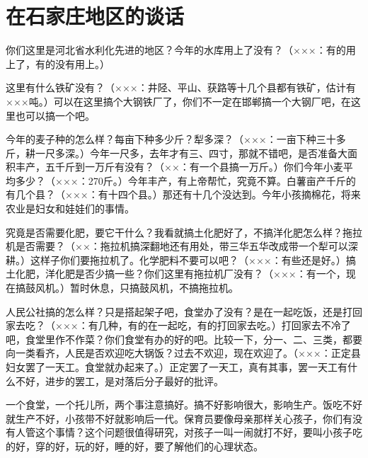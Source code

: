 \section[在石家庄地区的谈话（一九五八年十月三十一日）]{在石家庄地区的谈话}


你们这里是河北省水利化先进的地区？今年的水库用上了没有？（×××：有的用上了，有的没有用上。）

这里有什么铁矿没有？（×××：井陉、平山、获路等十几个县都有铁矿，估计有×××吨。）可以在这里搞个大钢铁厂了，你们不一定在邯郸搞一个大钢厂吧，在这里也可以搞一个吧。

今年的麦子种的怎么样？每亩下种多少斤？犁多深？（×××：一亩下种三十多斤，耕一尺多深。）今年一尺多，去年才有三、四寸，那就不错吧，是否准备大面积丰产，五千斤到一万斤有没有？（××：有一个县搞一万斤。）你们今年小麦平均多少？（×××：270斤。）今年丰产，有上帝帮忙，究竟不算。白薯亩产千斤的有几个县？（×××：有十四个县。）那还有十几个没达到。今年小孩摘棉花，将来农业是妇女和娃娃们的事情。

究竟是否需要化肥，要它干什么？我看就搞土化肥好了，不搞洋化肥怎么样？拖拉机是否需要？（××：拖拉机搞深翻地还有用处，带三华五华改成带一个犁可以深耕。）这样子你们要拖拉机了。化学肥料不要可以吧？（×××：有些还是好。）搞土化肥，洋化肥是否少搞一些？你们这里有拖拉机厂没有？（×××：有一个，现在搞鼓风机。）暂时休息，只搞鼓风机，不搞拖拉机。

人民公社搞的怎么样？只是搭起架子吧，食堂办了没有？是在一起吃饭，还是打回家去吃？（×××：有几种，有的在一起吃，有的打回家去吃。）打回家去不冷了吧，食堂里作不作菜？你们食堂有办的好的吧。比较一下，分一、二、三类，都要向一类看齐，人民是否欢迎吃大锅饭？过去不欢迎，现在欢迎了。（×××：正定县妇女罢了一天工。食堂就办起来了。）正定罢了一天工，真有其事，罢一天工有什么不好，进步的罢工，是对落后分子最好的批评。

一个食堂，一个托儿所，两个事注意搞好。搞不好影响很大，影响生产。饭吃不好就生产不好，小孩带不好就影响后一代。保育员要像母亲那样关心孩子，你们有没有人管这个事情？这个问题很值得研究，对孩子一叫一闹就打不好，要叫小孩子吃的好，穿的好，玩的好，睡的好，要了解他们的心理状态。

